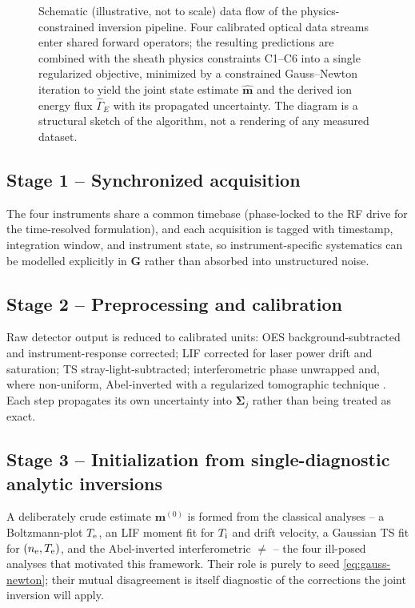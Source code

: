 \begin{figure}[htbp]
\caption{Schematic (illustrative, not to scale) data flow of the physics-constrained inversion pipeline. Four calibrated optical data streams enter shared forward operators; the resulting predictions are combined with the sheath physics constraints C1--C6 into a single regularized objective, minimized by a constrained Gauss--Newton iteration to yield the joint state estimate $\hat{\mathbf m}$ and the derived ion energy flux $\hat\Gamma_{E}$ with its propagated uncertainty. The diagram is a structural sketch of the algorithm, not a rendering of any measured dataset.}
\label{fig:pci-pipeline}
\end{figure}

\subsection{Stage 1 -- Synchronized acquisition}

The four instruments share a common timebase (phase-locked to the RF drive for the time-resolved formulation), and each acquisition is tagged with timestamp, integration window, and instrument state, so instrument-specific systematics can be modelled explicitly in $\mathbf G$ rather than absorbed into unstructured noise.

\subsection{Stage 2 -- Preprocessing and calibration}

Raw detector output is reduced to calibrated units: OES background-subtracted and instrument-response corrected; LIF corrected for laser power drift and saturation; TS stray-light-subtracted; interferometric phase unwrapped and, where non-uniform, Abel-inverted with a regularized tomographic technique \cite{ref0417}. Each step propagates its own uncertainty into $\boldsymbol\Sigma_{j}$ rather than being treated as exact.

\subsection{Stage 3 -- Initialization from single-diagnostic analytic inversions}

A deliberately crude estimate $\mathbf m^{(0)}$ is formed from the classical analyses -- a Boltzmann-plot $T_{\mathrm{e}}$, an LIF moment fit for $T_{\mathrm{i}}$ and drift velocity, a Gaussian TS fit for $(n_{\mathrm{e}},T_{\mathrm{e}})$, and the Abel-inverted interferometric $\ne$ -- the four ill-posed analyses that motivated this framework. Their role is purely to seed \cref{eq:gauss-newton}; their mutual disagreement is itself diagnostic of the corrections the joint inversion will apply.

